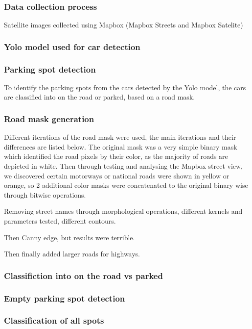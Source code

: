 \subsubsection{Data collection process}
Satellite images collected using Mapbox (Mapbox Streets and Mapbox Satelite)


\subsubsection{Yolo model used for car detection}


\subsubsection{Parking spot detection}
To identify the parking spots from the cars detected by the Yolo model, the cars are classified into on the road or parked, based on a road mask.

\subsubsection{Road mask generation}
Different iterations of the road mask were used, the main iterations and their differences are listed below.
The original mask was a very simple binary mask which identified the road pixels by their color, as the majority of roads are depicted in white.
Then through testing and analysing the Mapbox street view, we discovered certain motorways or national roads were shown in yellow or orange, so 2 additional color masks were concatenated to the original binary wise through bitwise operations.

Removing street names through morphological operations, different kernels and parameters tested, different contours.

Then Canny edge, but results were terrible.

Then finally added larger roads for highways.

\subsubsection{Classifiction into on the road vs parked}



\subsubsection{Empty parking spot detection}


\subsubsection{Classification of all spots}

